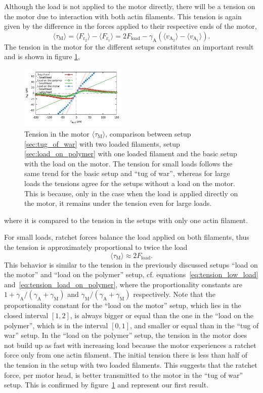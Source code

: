 \documentclass[aps,pre,twocolumn,showpacs,showkeys,superscriptaddress,floatfix]{revtex4-1}
\begin{document}
Although the load is not applied to the motor directly,
there will be a tension on the motor due to interaction with both actin filaments. 
This tension is again given by the difference in the forces applied to their respective ends of the motor,
\begin{equation}
\langle \tau_\text{M} \rangle
= \langle F_{\text{r}_2}\rangle - \langle F_{\text{r}_1}\rangle 
= 2 F_\text{load} - \gamma_\text{A} \left(\langle v_{\text{A}_2}\rangle - \langle v_{\text{A}_1}\rangle \right) .
\label{eq:tension_tug}
\end{equation}
The tension in the motor for the different setups constitutes an important result and is shown in figure \ref{fig:tug_F}, 
\begin{figure}[t]
\centering
\includegraphics[width=0.45\textwidth,height=!]{tug_F}
\caption{
\label{fig:tug_F}
Tension in the motor $\langle \tau_\text{M}\rangle$, comparison between setup \ref{sec:tug_of_war} with two loaded filaments, setup \ref{sec:load_on_polymer} with one loaded filament and the basic setup with the load on the motor. 
The tension for small loads follows the same trend for the basic setup and ``tug of war'', whereas for large loads the tensions agree for the setups without a load on the motor. 
This is because, only in the case when the load is applied directly on the motor, it remains under the tension even for large loads.
}
\end{figure}
where it is compared to the tension in the setups with only one actin filament.

For small loads, ratchet forces balance the load applied on both filaments, thus the tension is approximately proportional to twice the load 
\[
\langle \tau_\text{M} \rangle \approx 2 F_\text{load} .
\] 
This behavior is similar to the tension in the previously discussed setups  ``load on the motor'' and ``load on the polymer'' setup, cf. equations~\eqref{eq:tension_low_load} and~\eqref{eq:tension_load_on_polymer}, 
where the proportionality constants are $ 1 + \gamma_\text{A} / (\gamma_\text{A} + \gamma_\text{M} )$ and $\gamma_\text{M} / (\gamma_\text{A} + \gamma_\text{M} )$ respectively. 
Note that the proportionality constant for the ``load on the motor'' setup, which lies in the closed interval $[1,2]$, 
is always bigger or equal than the one in the ``load on the polymer'', which is in the interval $[0,1]$, and smaller or equal than in the ``tug of war'' setup. 
In the ``load on the polymer'' setup, the tension in the motor does not build up as fast with increasing load because the motor experiences a ratchet force only from one actin filament.
The initial tension there is less than half of the tension in the setup with two loaded filaments.
This suggests that the ratchet force, per motor head, is better transmitted to the motor in the ``tug of war'' setup.
This is confirmed by figure~\ref{fig:tug_F} and represent our first result.
\end{document}
